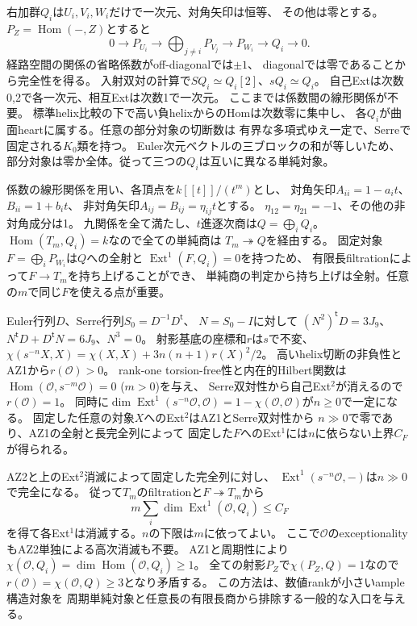 \documentclass[11pt,a4paper]{ltjsarticle}
\begin{document}
右加群$Q_i$は$U_i,V_i,W_i$だけで一次元、対角矢印は恒等、
その他は零とする。$P_Z=\operatorname{Hom}(-,Z)$とすると
\[
 0\to P_{U_i}\to\bigoplus_{j\ne i}P_{V_j}
   \to P_{W_i}\to Q_i\to0.
\]
経路空間の関係の省略係数がoff-diagonalでは$\pm1$、
diagonalでは零であることから完全性を得る。
入射双対の計算で$SQ_i\simeq Q_i[2]$、$sQ_i\simeq Q_i$。
自己Extは次数0,2で各一次元、相互Extは次数1で一次元。
ここまでは係数間の線形関係が不要。
標準helix比較の下で高い負helixからのHomは次数零に集中し、
各$Q_i$が曲面heartに属する。任意の部分対象の切断数は
有界な多項式ゆえ一定で、Serreで固定される$K_0$類を持つ。
Euler次元ベクトルの三ブロックの和が等しいため、
部分対象は零か全体。従って三つの$Q_i$は互いに異なる単純対象。

係数の線形関係を用い、各頂点を$k[[t]]/(t^m)$とし、
対角矢印$A_{ii}=1-a_i t$、$B_{ii}=1+b_i t$、
非対角矢印$A_{ij}=B_{ij}=\eta_{ij}t$とする。
$\eta_{12}=\eta_{21}=-1$、その他の非対角成分は1。
九関係を全て満たし、$t$進逐次商は$Q=\bigoplus_i Q_i$。
$\operatorname{Hom}(T_m,Q_i)=k$なので全ての単純商は
$T_m\twoheadrightarrow Q$を経由する。
固定対象$F=\bigoplus_i P_{W_i}$は$Q$への全射と
$\operatorname{Ext}^1(F,Q_i)=0$を持つため、
有限長filtrationによって$F\to T_m$を持ち上げることができ、
単純商の判定から持ち上げは全射。任意の$m$で同じ$F$を使える点が重要。

Euler行列$D$、Serre行列$S_0=D^{-1}D^{\mathsf t}$、
$N=S_0-I$に対して
$(N^2)^{\mathsf t}D=3J_9$、
$N^{\mathsf t}D+D^{\mathsf t}N=6J_9$、$N^3=0$。
射影基底の座標和$r$は$s$で不変、
$\chi(s^{-n}X,X)=\chi(X,X)+3n(n+1)r(X)^2/2$。
高いhelix切断の非負性とAZ1から$r(\mathcal O)>0$。
rank-one torsion-free性と内在的Hilbert関数は
$\operatorname{Hom}(\mathcal O,s^{-m}\mathcal O)=0$ ($m>0$)を与え、
Serre双対性から自己Ext$^2$が消えるので$r(\mathcal O)=1$。
同時に$\dim\operatorname{Ext}^1(s^{-n}\mathcal O,\mathcal O)
=1-\chi(\mathcal O,\mathcal O)$が$n\geq0$で一定になる。
固定した任意の対象$X$へのExt$^2$はAZ1とSerre双対性から
$n\gg0$で零であり、AZ1の全射と長完全列によって
固定した$F$へのExt$^1$には$n$に依らない上界$C_F$が得られる。

AZ2と上のExt$^2$消滅によって固定した完全列に対し、
$\operatorname{Ext}^1(s^{-n}\mathcal O,-)$は$n\gg0$で完全になる。
従って$T_m$のfiltrationと$F\twoheadrightarrow T_m$から
\[
 m\sum_i\dim\operatorname{Ext}^1(\mathcal O,Q_i)\leq C_F
\]
を得て各Ext$^1$は消滅する。$n$の下限は$m$に依ってよい。
ここで$\mathcal O$のexceptionalityもAZ2単独による高次消滅も不要。
AZ1と周期性により$\chi(\mathcal O,Q_i)=
\dim\operatorname{Hom}(\mathcal O,Q_i)\geq1$。
全ての射影$P_Z$で$\chi(P_Z,Q)=1$なので
$r(\mathcal O)=\chi(\mathcal O,Q)\geq3$となり矛盾する。
この方法は、数値rankが小さいample構造対象を
周期単純対象と任意長の有限長商から排除する一般的な入口を与える。
\end{document}
